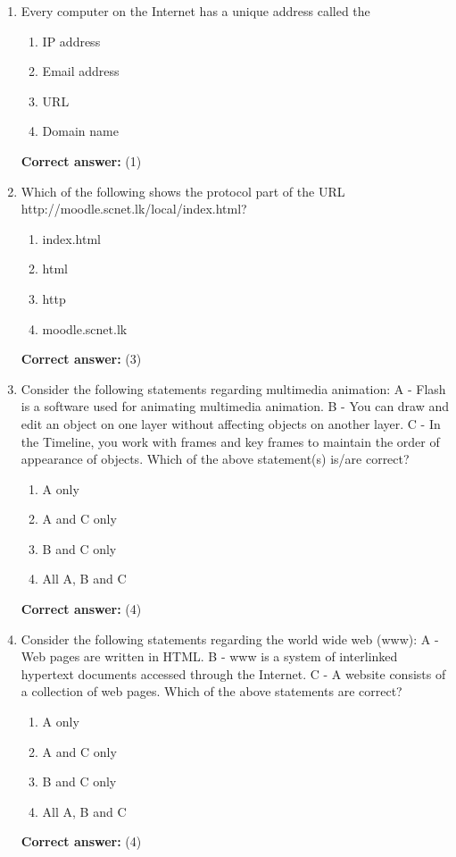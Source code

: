 \documentclass[12pt]{article}
\begin{document}
\begin{enumerate}[label=Q\arabic*:,leftmargin=*,resume]
\item Every computer on the Internet has a unique address called the\\
\begin{enumerate}[label=(\arabic*)]
\item IP address
\item Email address
\item URL
\item Domain name
\end{enumerate}
\textbf{Correct answer:} (1)

\item Which of the following shows the protocol part of the URL http://moodle.scnet.lk/local/index.html?\\
\begin{enumerate}[label=(\arabic*)]
\item index.html
\item html
\item http
\item moodle.scnet.lk
\end{enumerate}
\textbf{Correct answer:} (3)

\item Consider the following statements regarding multimedia animation: A - Flash is a software used for animating multimedia animation. B - You can draw and edit an object on one layer without affecting objects on another layer. C - In the Timeline, you work with frames and key frames to maintain the order of appearance of objects. Which of the above statement(s) is/are correct?\\
\begin{enumerate}[label=(\arabic*)]
\item A only
\item A and C only
\item B and C only
\item All A, B and C
\end{enumerate}
\textbf{Correct answer:} (4)

\item Consider the following statements regarding the world wide web (www): A - Web pages are written in HTML. B - www is a system of interlinked hypertext documents accessed through the Internet. C - A website consists of a collection of web pages. Which of the above statements are correct?\\
\begin{enumerate}[label=(\arabic*)]
\item A only
\item A and C only
\item B and C only
\item All A, B and C
\end{enumerate}
\textbf{Correct answer:} (4)


\end{enumerate}
\end{document}
